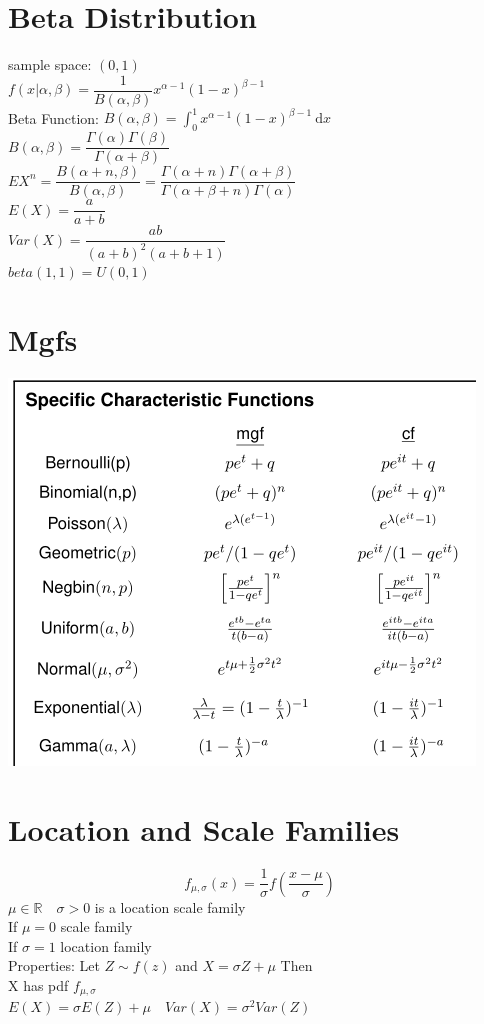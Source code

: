 \documentclass[openany]{book}
\newcommand{\dx}{\mathrm{d}x}
\begin{document}
\section{Beta Distribution}
sample space: $(0,1)$\\
$f(x|\alpha,\beta)=\dfrac{1}{B(\alpha,\beta)}x^{\alpha-1}(1-x)^{\beta-1}$\\
Beta Function: $B(\alpha,\beta)=\int_{0}^{1}x^{\alpha-1}(1-x)^{\beta-1} \ \dx$ \\ 
$B(\alpha,\beta)=\dfrac{\Gamma(\alpha)\Gamma(\beta)}{\Gamma(\alpha+\beta)}$\\
$EX^n=\dfrac{B(\alpha+n,\beta)}{B(\alpha,\beta)}=\dfrac{\Gamma(\alpha+n)\Gamma(\alpha+\beta)}{\Gamma(\alpha+\beta+n)\Gamma(\alpha)}$\\
$E(X)=\dfrac{a}{a+b}$\\
$Var(X)=\dfrac{ab}{(a+b)^2(a+b+1)}$\\
$beta(1,1)=U(0,1)$
\section{Mgfs}
\includegraphics[scale=1]{mgfchar.png}
\section{Location and Scale Families}
\[f_{\mu,\sigma}(x)=\dfrac{1}{\sigma}f\left(\dfrac{x-\mu}{\sigma} \right)
\]
$\mu \in \mathbb{R} \quad \sigma>0$ is a location scale family\\
If $\mu=0$ scale family\\
If $\sigma=1$ location family\\
Properties: Let $Z\sim f(z)$ and $X=\sigma Z+\mu$ Then\\
X has pdf $f_{\mu,\sigma}$\\
$E(X)=\sigma E(Z)+\mu \quad Var(X)=\sigma^2 Var(Z)$
\end{document}
